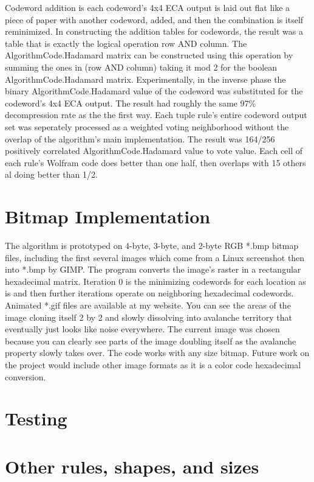 \documentclass[11pt]{article}
\begin{document}
Codeword addition is each codeword's 4x4 ECA output is laid out flat like a piece of paper with another codeword, added, and then the combination is itself reminimized. In constructing the addition tables for codewords, the result was a table that is exactly the logical operation row AND column. The AlgorithmCode.Hadamard matrix can be constructed using this operation by summing the ones in (row AND column) taking it mod 2 for the boolean AlgorithmCode.Hadamard matrix. Experimentally, in the inverse phase the binary AlgorithmCode.Hadamard value of the codeword was substituted for the codeword's 4x4 ECA output. The result had roughly the same 97\% decompression rate as the the first way. Each tuple rule's entire codeword output set was seperately processed as a weighted voting neighborhood without the overlap of the algorithm's main implementation. The result was 164/256 positively correlated AlgorithmCode.Hadamard value to vote value. Each cell of each rule's Wolfram code does better than one half, then overlaps with 15 others al doing better than 1/2.\\

\section{Bitmap Implementation}

The algorithm is prototyped on 4-byte, 3-byte, and 2-byte RGB *.bmp bitmap files, including the first several images which come from a Linux screenshot then into *.bmp by GIMP. The program converts the image's raster in a rectangular hexadecimal matrix. Iteration 0 is the minimizing codewords for each location as is and then further iterations operate on neighboring hexadecimal codewords. Animated *.gif files are available at my website. You can see the areas of the image cloning itself 2 by 2 and slowly dissolving into avalanche territory that eventually just looks like noise everywhere. The current image was chosen because you can clearly see parts of the image doubling itself as the avalanche property slowly takes over. The code works with any size bitmap. Future work on the project would include other image formats as it is a color code hexadecimal conversion. \\

\section{Testing}


\section{Other rules, shapes, and sizes}
\end{document}
